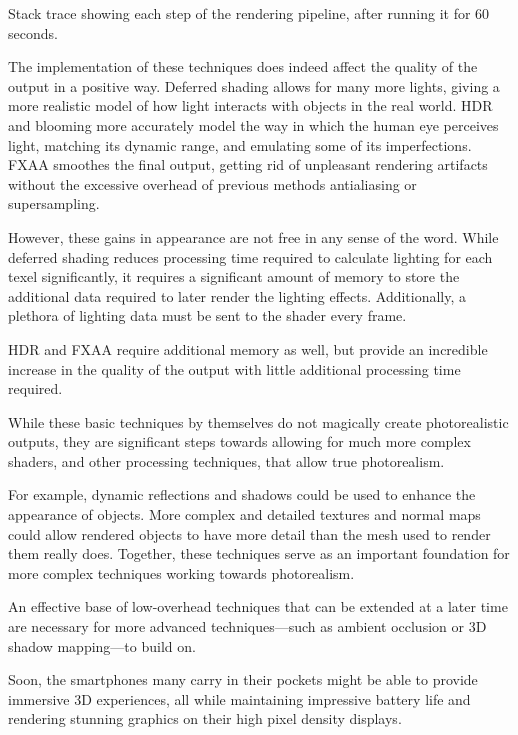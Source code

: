 \documentclass[11pt, oneside]{report}
\renewcommand{\baselinestretch}{1.6}
\begin{document}
\begin{table}[!htbp]
	\caption{Stack trace showing each step of the rendering pipeline, after running it for 60 seconds.}
	\label{tab:booktabs}
\end{table}
\renewcommand{\baselinestretch}{1.6}

The implementation of these techniques does indeed affect the quality of the output in a positive way. Deferred shading allows for many more lights, giving a more realistic model of how light interacts with objects in the real world. \gls{HDR} and blooming more accurately model the way in which the human eye perceives light, matching its dynamic range, and emulating some of its imperfections. \gls{FXAA} smoothes the final output, getting rid of unpleasant rendering artifacts without the excessive overhead of previous methods antialiasing or \gls{supersampling}.

However, these gains in appearance are not free in any sense of the word. While deferred shading reduces processing time required to calculate lighting for each \gls{texel} significantly, it requires a significant amount of memory to store the additional data required to later render the lighting effects. Additionally, a plethora of lighting data must be sent to the shader every frame.

\gls{HDR} and \gls{FXAA} require additional memory as well, but provide an incredible increase in the quality of the output with little additional processing time required.

While these basic techniques by themselves do not magically create photorealistic outputs, they are significant steps towards allowing for much more complex shaders, and other processing techniques, that allow true photorealism. 

For example, dynamic reflections and shadows could be used to enhance the appearance of objects. More complex and detailed textures and normal maps could allow rendered objects to have more detail than the mesh used to render them really does. Together, these techniques serve as an important foundation for more complex techniques working towards photorealism.

An effective base of low-overhead techniques that can be extended at a later time are necessary for more advanced techniques---such as ambient occlusion or 3D shadow mapping---to build on.

Soon, the smartphones many carry in their pockets might be able to provide immersive 3D experiences, all while maintaining impressive battery life and rendering stunning graphics on their high pixel density displays.
	
\end{document}
